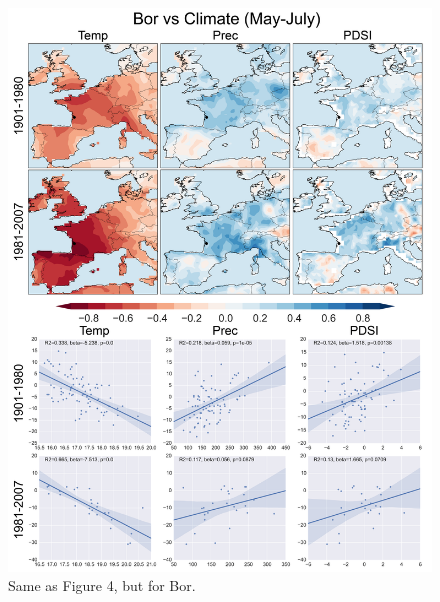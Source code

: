 \documentclass[12pt]{article}
\begin{document}
\begin{figure}
\center
\includegraphics[width=.9\columnwidth,scale=2]{SUPP_fig_05_Bor_MJJ_climate_onedeg_withtrend.png}
\caption{Same as Figure 4, but for Bor.}
\end{figure}
\end{document}

